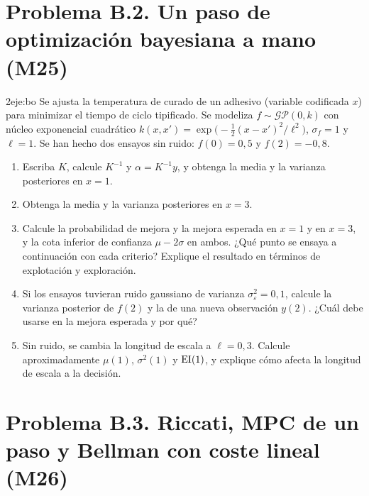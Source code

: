 \section*{Problema B.2. Un paso de optimización bayesiana a mano (M25)}

\begin{ejercicio}{2}{eje:bo}
Se ajusta la temperatura de curado de un adhesivo (variable codificada $x$) para minimizar el tiempo de ciclo tipificado. Se modeliza $f\sim\mathcal{GP}(0,k)$ con núcleo exponencial cuadrático $k(x,x')=\exp\bigl(-\tfrac12(x-x')^{2}/\ell^{2}\bigr)$, $\sigma_f=1$ y $\ell=1$. Se han hecho dos ensayos sin ruido: $f(0)=0{,}5$ y $f(2)=-0{,}8$.
\begin{enumerate}[label=(\alph*)]
  \item {} Escriba $K$, calcule $K^{-1}$ y $\alpha=K^{-1}y$, y obtenga la media y la varianza posteriores en $x=1$.
  \item {} Obtenga la media y la varianza posteriores en $x=3$.
  \item {} Calcule la probabilidad de mejora y la mejora esperada en $x=1$ y en $x=3$, y la cota inferior de confianza $\mu-2\sigma$ en ambos. ¿Qué punto se ensaya a continuación con cada criterio? Explique el resultado en términos de explotación y exploración.
  \item {} Si los ensayos tuvieran ruido gaussiano de varianza $\sigma_\varepsilon^{2}=0{,}1$, calcule la varianza posterior de $f(2)$ y la de una nueva observación $y(2)$. ¿Cuál debe usarse en la mejora esperada y por qué?
  \item {} Sin ruido, se cambia la longitud de escala a $\ell=0{,}3$. Calcule aproximadamente $\mu(1)$, $\sigma^{2}(1)$ y $\mathrm{EI}(1)$, y explique cómo afecta la longitud de escala a la decisión.
\end{enumerate}
\end{ejercicio}

\section*{Problema B.3. Riccati, MPC de un paso y Bellman con coste lineal (M26)}

